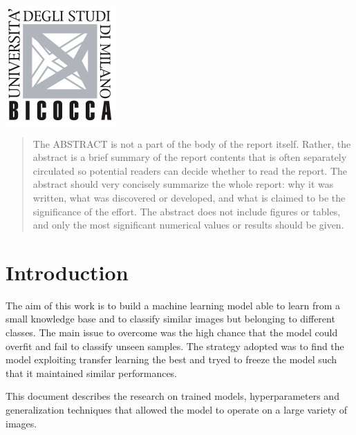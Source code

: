 \begin{titlepage}

\includegraphics{logo.png}\\[1cm] %
 

\vfill %

\end{titlepage}


\begin{abstract}
The ABSTRACT is not a part of the body of the report itself. Rather, the abstract is a brief summary of the report contents that is often separately circulated so potential readers can decide whether to read the report. The abstract should very concisely summarize the whole report: why it was written, what was discovered or developed, and what is claimed to be the significance of the effort. The abstract does not include figures or tables, and only the most significant numerical values or results should be given.
\end{abstract}

\section{Introduction}


The aim of this work is to build a machine learning model able to learn from a small knowledge base and to classify similar images but belonging to different classes.
The main issue to overcome was the high chance that the model could overfit and fail to classify unseen samples. The strategy adopted was to find the model exploiting transfer learning the best and tryed to freeze the model such that it maintained similar performances. \par
This document describes the research on trained models, hyperparameters and generalization techniques that allowed the model to operate on a large variety of images. 






